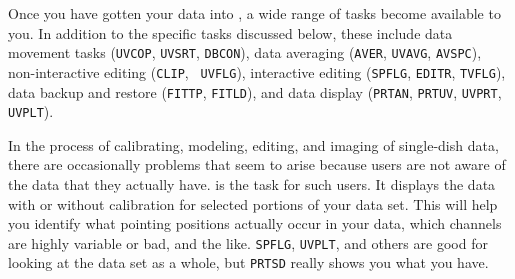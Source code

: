      Once you have gotten your data into \AIPS, a wide range of tasks
become available to you.  In addition to the 
specific tasks discussed below, these include data movement tasks
({\tt UVCOP}, {\tt UVSRT}, {\tt DBCON}), data averaging ({\tt AVER},
{\tt UVAVG}, {\tt AVSPC}), non-interactive editing ({\tt CLIP}, {\tt
UVFLG}), interactive editing ({\tt SPFLG}, {\tt EDITR}, {\tt TVFLG}),
data backup and restore ({\tt FITTP}, {\tt FITLD}), and data display
({\tt PRTAN}, {\tt PRTUV}, {\tt UVPRT}, {\tt UVPLT}).


     In the process of calibrating, modeling, editing, and imaging of
single-dish data, there are occasionally problems that seem to arise
because  users are not aware of the data that they actually have.
{\tt {}} is the task for such users.  It displays the data
with or without calibration for selected portions of your data set.
This will help you identify what pointing positions actually occur in
your data, which channels are highly variable or bad, and the like.
{\tt SPFLG}, {\tt UVPLT}, and others are good for looking at the data
set as a whole, but {\tt PRTSD} really shows you what you have.

